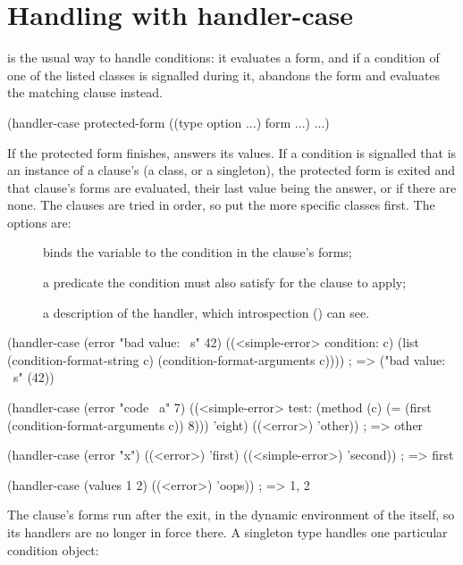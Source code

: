 \section{Handling with handler-case}\label{sec:conditions-handler-case}

 is the usual way to handle conditions: it evaluates a
form, and if a condition of one of the listed classes is signalled during
it, abandons the form and evaluates the matching clause instead.

\begin{dylan}
(handler-case protected-form
  ((type option ...) form ...)
  ...)
\end{dylan}

\noindent If the protected form finishes,  answers its
values. If a condition is signalled that is an instance of a clause's
 (a class, or a singleton), the protected form is exited and
that clause's forms are evaluated, their last value being the answer, or
 if there are none. The clauses are tried in order, so put the
more specific classes first. The options are:

\begin{description}
\item[] binds the variable  to the
  condition in the clause's forms;
\item[] a predicate the condition must
  also satisfy for the clause to apply;
\item[] a description of the handler,
  which introspection () can see.
\end{description}

\begin{dylan}
(handler-case (error "bad value: ~s" 42)
  ((<simple-error> condition: c)
   (list (condition-format-string c) (condition-format-arguments c))))
; => ("bad value: ~s" (42))

(handler-case (error "code ~a" 7)
  ((<simple-error> test: (method (c) (= (first (condition-format-arguments c)) 8)))
   'eight)
  ((<error>) 'other))
; => other

(handler-case (error "x")
  ((<error>) 'first)
  ((<simple-error>) 'second))
; => first

(handler-case (values 1 2)
  ((<error>) 'oops))
; => 1, 2
\end{dylan}

\noindent The clause's forms run after the exit, in the dynamic
environment of the  itself, so its handlers are no
longer in force there. A singleton type handles one particular
condition object:

